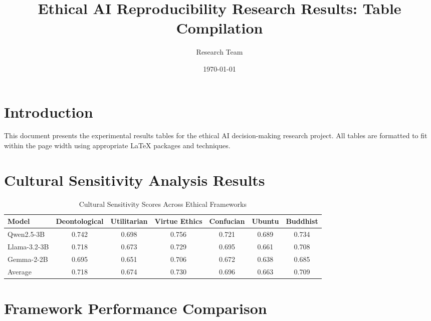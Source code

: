 \documentclass[11pt,a4paper]{article}
\title{Ethical AI Reproducibility Research Results: Table Compilation}
\author{Research Team}
\date{\today}
\begin{document}
\maketitle

\section{Introduction}
This document presents the experimental results tables for the ethical AI decision-making research project. All tables are formatted to fit within the page width using appropriate LaTeX packages and techniques.

\section{Cultural Sensitivity Analysis Results}

\begin{table}[htbp]
\centering
\begin{adjustbox}{width=\textwidth}
\begin{tabular}{|l|c|c|c|c|c|c|}
\hline
\textbf{Model} & \textbf{Deontological} & \textbf{Utilitarian} & \textbf{Virtue Ethics} & \textbf{Confucian} & \textbf{Ubuntu} & \textbf{Buddhist} \\
\hline
Qwen2.5-3B & 0.742 & 0.698 & 0.756 & 0.721 & 0.689 & 0.734 \\
\hline
Llama-3.2-3B & 0.718 & 0.673 & 0.729 & 0.695 & 0.661 & 0.708 \\
\hline
Gemma-2-2B & 0.695 & 0.651 & 0.706 & 0.672 & 0.638 & 0.685 \\
\hline
Average & 0.718 & 0.674 & 0.730 & 0.696 & 0.663 & 0.709 \\
\hline
\end{tabular}
\end{adjustbox}
\caption{Cultural Sensitivity Scores Across Ethical Frameworks}
\label{tab:cultural_sensitivity}
\end{table}

\section{Framework Performance Comparison}
\end{document}
